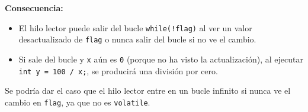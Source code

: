\begin{enumerate}
\begin{enumerate}
        \textbf{Consecuencia:}
        
        \begin{itemize}
            \item El hilo lector puede salir del bucle \texttt{while(!flag){}} al ver un valor desactualizado de \texttt{flag} o nunca salir del bucle si no ve el cambio.
            \item Si sale del bucle y \texttt{x} aún es \texttt{0} (porque no ha visto la actualización), al ejecutar \texttt{int y = 100 / x;}, se producirá una división por cero.
        \end{itemize}
         Se podría dar el caso que el hilo lector entre en un bucle infinito si nunca ve el cambio en \texttt{flag}, ya que no es \texttt{volatile}.
            \end{enumerate}
    
\end{enumerate}
